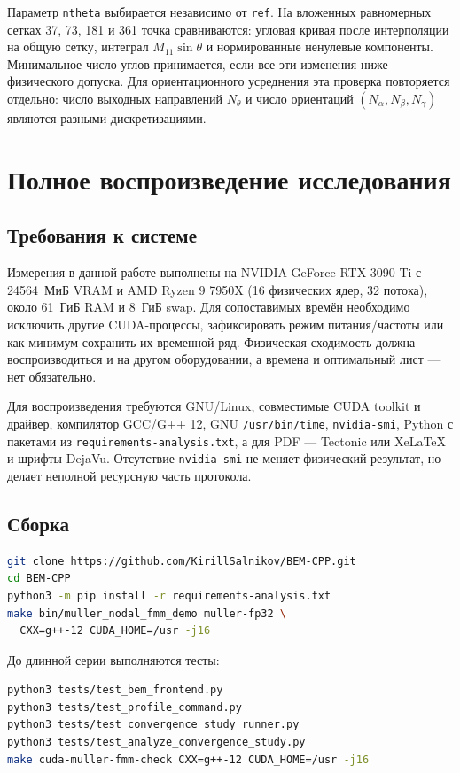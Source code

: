 \documentclass[12pt,a4paper]{article}
\begin{document}
Параметр \texttt{ntheta} выбирается независимо от \texttt{ref}. На вложенных
равномерных сетках 37, 73, 181 и 361 точка сравниваются: угловая кривая после
интерполяции на общую сетку, интеграл $M_{11}\sin\theta$ и нормированные
ненулевые компоненты. Минимальное число углов принимается, если все эти
изменения ниже физического допуска. Для ориентационного усреднения эта проверка
повторяется отдельно: число выходных направлений $N_\theta$ и число ориентаций
$(N_\alpha,N_\beta,N_\gamma)$ являются разными дискретизациями.

\section{Полное воспроизведение исследования}

\subsection{Требования к системе}

Измерения в данной работе выполнены на NVIDIA GeForce RTX 3090 Ti с 24564~МиБ
VRAM и AMD Ryzen 9 7950X (16 физических ядер, 32 потока), около 61~ГиБ RAM и
8~ГиБ swap. Для сопоставимых времён необходимо исключить другие CUDA-процессы,
зафиксировать режим питания/частоты или как минимум сохранить их временной ряд.
Физическая сходимость должна воспроизводиться и на другом оборудовании, а
времена и оптимальный лист --- нет обязательно.

Для воспроизведения требуются GNU/Linux, совместимые CUDA toolkit и драйвер,
компилятор GCC/G++ 12, GNU \texttt{/usr/\allowbreak bin/\allowbreak time},
\texttt{nvidia-\allowbreak smi}, Python
с пакетами из \texttt{requirements-\allowbreak analysis.txt}, а для PDF --- Tectonic или
XeLaTeX и шрифты DejaVu. Отсутствие \texttt{nvidia-smi} не меняет физический
результат, но делает неполной ресурсную часть протокола.

\subsection{Сборка}

\begin{lstlisting}[language=bash]
git clone https://github.com/KirillSalnikov/BEM-CPP.git
cd BEM-CPP
python3 -m pip install -r requirements-analysis.txt
make bin/muller_nodal_fmm_demo muller-fp32 \
  CXX=g++-12 CUDA_HOME=/usr -j16
\end{lstlisting}

До длинной серии выполняются тесты:
\begin{lstlisting}[language=bash]
python3 tests/test_bem_frontend.py
python3 tests/test_profile_command.py
python3 tests/test_convergence_study_runner.py
python3 tests/test_analyze_convergence_study.py
make cuda-muller-fmm-check CXX=g++-12 CUDA_HOME=/usr -j16
\end{lstlisting}
\end{document}

